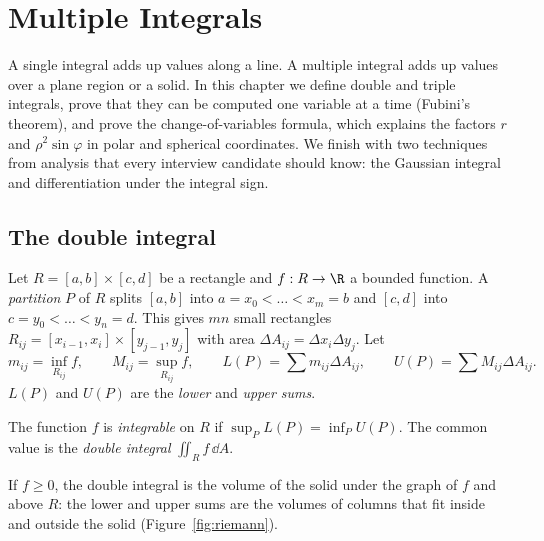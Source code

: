\chapter{Multiple Integrals}
\label{ch:multint}

A single integral adds up values along a line. A multiple integral adds up values over a plane region or a solid. In this chapter we define double and triple integrals, prove that they can be computed one variable at a time (Fubini's theorem), and prove the change-of-variables formula, which explains the factors $r$ and $\rho^2\sin\varphi$ in polar and spherical coordinates. We finish with two techniques from analysis that every interview candidate should know: the Gaussian integral and differentiation under the integral sign.

\section{The double integral}

Let $R=[a,b]\times[c,d]$ be a rectangle and $f:R\to\R$ a bounded function. A \emph{partition} $P$ of $R$ splits $[a,b]$ into $a=x_0<\dots<x_m=b$ and $[c,d]$ into $c=y_0<\dots<y_n=d$. This gives $mn$ small rectangles $R_{ij}=[x_{i-1},x_i]\times[y_{j-1},y_j]$ with area $\Delta A_{ij}=\Delta x_i\Delta y_j$. Let
\[
m_{ij}=\inf_{R_{ij}}f,\qquad M_{ij}=\sup_{R_{ij}}f,\qquad L(P)=\sum m_{ij}\Delta A_{ij},\qquad U(P)=\sum M_{ij}\Delta A_{ij}.
\]
$L(P)$ and $U(P)$ are the \emph{lower} and \emph{upper sums}.

\begin{definition}
The function $f$ is \emph{integrable} on $R$ if $\sup_PL(P)=\inf_PU(P)$. The common value is the \emph{double integral} $\displaystyle\iint_Rf\,\dd A$.
\end{definition}

If $f\ge0$, the double integral is the volume of the solid under the graph of $f$ and above $R$: the lower and upper sums are the volumes of columns that fit inside and outside the solid (Figure~\ref{fig:riemann}).

